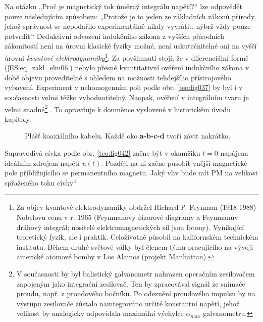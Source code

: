     Na otázku „Proč je magnetický tok úměrný integrálu napětí?“ lze odpovědět pouze následujícím
    způsobem: „Protože je to jeden ze základních zákonů přírody, jehož správnost se nepodařilo
    experimentálně nikdy vyvrátit, nýbrž vždy pouze potvrdit.“ Deduktivní odvození indukčního
    zákona z vyšších přírodních zákonitostí není na úrovni klasické fyziky možné, není
    uskutečnitelné ani na vyšší úrovni \emph{kvantové elektrodynamiky}\footnote{Za objev kvantové
    elektrodynamiky obdržel Richard P. Feynman (1918-1988) Nobelovu cenu v r. 1965 (Feynmanovy
    fázorové diagramy a Feynmanův dráhový integrál; nositelé elektromagnetických sil jsou fotony). 
    Vynikající teoretický fyzik, ale i praktik. Celoživotně působil na kalifornském technickém
    institutu. Během druhé světové války byl členem týmu pracujícího na vývoji americké atomové
    bomby v Los Alamos (projekt Manhattan).}. Za povšimnutí stojí, že v diferenciální formě
    (\ref{ES:eq_zakl_elm06}) nebylo přesné kvantitativní ověření indukčního zákona v době objevu
    proveditelné s ohledem na možnosti tehdejšího přístrojového vybavení. Experiment v nehomogenním
    poli podle obr. \ref{teo:fig037} by byl i v současnosti velmi těžko   
    vyhodnotitelný. Naopak, ověření v integrálním tvaru je velmi snadné\footnote{V současnosti by
    byl balistický galvanometr nahrazen operačním zesilovačem zapojeným jako integrační zesilovač.
    Ten by zpracovával signál ze snímače proudu, např. z proudového bočníku. Po odeznění proudového
    impulsu by na výstupu zesilovače zůstalo naintegrováno určité konstantní napětí, jehož velikost
    by analogicky odpovídala maximální výchylce \(\alpha_{max}\) galvanometru.} . To opravňuje k
    domněnce vyslovené v historickém úvodu kapitoly.

    \begin{figure}[ht!]
      \centering  
      \caption{Plášť koaxiálního kabelu. Každé oko \textbf{a-b-c-d} tvoří závit nakrátko.} 
      \label{teo:fig041}
    \end{figure}
      
    Supravodivá cívka podle obr. \ref{teo:fig042} začne být v okamžiku \(t = 0\)
    napájena ideálním zdrojem napětí \(u(t)\). Později na ni začne působit vnější magnetické pole
    přibližujícího se permanentního magnetu. Jaký vliv bude mít PM na velikost spřaženého toku
    cívky?
    
